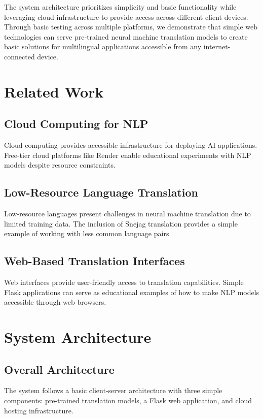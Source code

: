 \documentclass[conference]{IEEEtran}
\begin{document}
The system architecture prioritizes simplicity and basic functionality while leveraging cloud infrastructure to provide access across different client devices. Through basic testing across multiple platforms, we demonstrate that simple web technologies can serve pre-trained neural machine translation models to create basic solutions for multilingual applications accessible from any internet-connected device.

\section{Related Work}

\subsection{Cloud Computing for NLP}

Cloud computing provides accessible infrastructure for deploying AI applications. Free-tier cloud platforms like Render enable educational experiments with NLP models despite resource constraints.

\subsection{Low-Resource Language Translation}

Low-resource languages present challenges in neural machine translation due to limited training data. The inclusion of Snejag translation provides a simple example of working with less common language pairs.

\subsection{Web-Based Translation Interfaces}

Web interfaces provide user-friendly access to translation capabilities. Simple Flask applications can serve as educational examples of how to make NLP models accessible through web browsers.

\section{System Architecture}

\subsection{Overall Architecture}

The system follows a basic client-server architecture with three simple components: pre-trained translation models, a Flask web application, and cloud hosting infrastructure.
\end{document}
